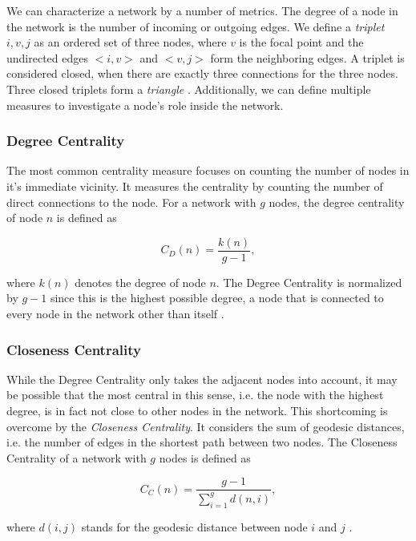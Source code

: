 We can characterize a network by a number of metrics. The degree of a node in the network is the number of incoming or outgoing edges. We define a \emph{triplet} $i, v, j$ as an ordered set of three nodes, where $v$ is the focal point and the undirected edges $<i, v>$ and $<v, j>$ form the neighboring edges. A triplet is considered closed, when there are exactly three connections for the three nodes. Three closed triplets form a \emph{triangle} \cite{graphintro}. Additionally, we can define multiple measures to investigate a node's role inside the network.

\subsubsection{Degree Centrality}

The most common centrality measure focuses on counting the number of nodes in it's immediate vicinity. It measures the centrality by counting the number of direct connections to the node. For a network with $g$ nodes, the degree centrality of node $n$ is defined as

\begin{equation}
C_D(n) = \frac{k(n)}{g-1},
\end{equation}

where $k(n)$ denotes the degree of node $n$. The Degree Centrality is normalized by $g-1$ since this is the highest possible degree, a node that is connected to every node in the network other than itself \cite{graphintro}.

\subsubsection{Closeness Centrality}

While the Degree Centrality only takes the adjacent nodes into account, it may be possible that the most central in this sense, i.e. the node with the highest degree, is in fact not close to other nodes in the network. This shortcoming is overcome by the \emph{Closeness Centrality}. It considers the sum of geodesic distances, i.e. the number of edges in the shortest path between two nodes. The Closeness Centrality of a network with $g$ nodes is defined as 

\begin{equation}
C_C(n) = \frac{g - 1}{\sum\limits_{i=1}^g d(n, i)},
\end{equation}

where $d(i, j)$ stands for the geodesic distance between node $i$ and $j$ \cite{graphintro}.

